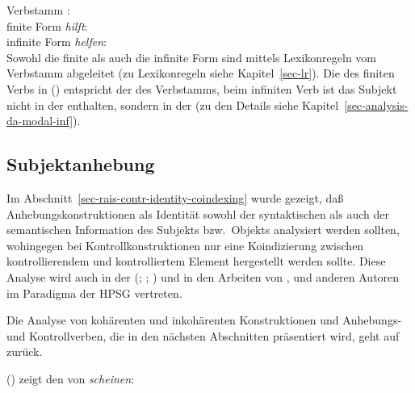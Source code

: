 {
\ea
Verbstamm :\\
\z 
\ea
finite Form \emph{hilft}:\\
\z 
\ea
infinite Form \emph{helfen}:\\
\z
Sowohl die finite als auch die infinite Form sind mittels Lexikonregeln vom Verbstamm abgeleitet
(zu Lexikonregeln siehe Kapitel~\ref{sec-lr}). Die \subcatl des finiten Verbs in () entspricht der \subcatl
des Verbstamms, beim infiniten Verb ist das Subjekt nicht in der \subcatl enthalten, sondern in der
\subjl (zu den Details siehe Kapitel~\ref{sec-analysis-da-modal-inf}).


\subsection{Subjektanhebung}
\label{sec-subjektanhebung-anal}

Im Abschnitt~\ref{sec-rais-contr-identity-coindexing} wurde gezeigt,
daß Anhebungskonstruktionen als Identität sowohl der syntaktischen
als auch der semantischen Information des Subjekts bzw.\ Objekts analysiert werden
sollten, wohingegen bei Kontrollkonstruktionen nur eine Koindizierung
zwischen kontrollierendem und kontrolliertem Element hergestellt werden sollte.
Diese Analyse wird auch in der \lfg
(\citealp{Andrews82b}; \citealp{Neidle82a}; \citealp[]{Bresnan82c})
und in den Arbeiten von \citet[Kapitel~7]{ps2}, \citet{Kiss95a}
und anderen Autoren im Paradigma der HPSG vertreten.

Die Analyse von kohärenten und inkohärenten Konstruktionen und Anhebungs- und
Kontrollverben, die in den nächsten Abschnitten präsentiert wird,
geht auf \citet{Kiss95a} zurück. 

() zeigt den \locw von \emph{scheinen}:

}
